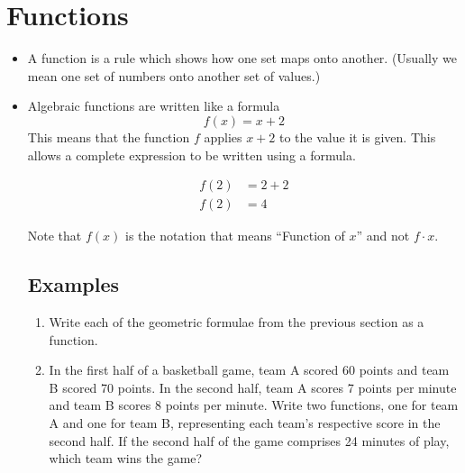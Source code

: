 \documentclass{article}
\begin{document}
\section*{Functions}
\begin{itemize}
\item A function is a rule which shows how one set maps onto another.  (Usually we mean one set of numbers onto another set of values.)
\item Algebraic functions are written like a formula\newline
\[
f(x) = x + 2
\]
This means that the function $f$ applies $x+2$ to the value it is given.  This allows a complete expression to be written using a formula.

\begin{align*}
f(2) &= 2 + 2 \\
f(2) &= 4
\end{align*}

Note that $f(x)$ is the notation that means ``Function of $x$'' and not $f \cdot x$.
\subsection*{Examples}
\begin{enumerate}
  \item Write each of the geometric formulae from the previous section as a function.
  \item In the first half of a basketball game, team A scored 60 points and team B scored 70 points.  In the second half, team A scores 7 points per minute and team B scores 8 points per minute.  Write two functions, one for team A and one for team B, representing each team's respective score in the second half.  If the second half of the game comprises 24 minutes of play, which team wins the game?
\end{enumerate}


\end{itemize}
\end{document}
